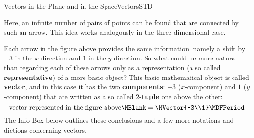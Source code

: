 \begin{MXContent}{Vectors in the Plane and in the Space}{Vectors}{STD}
\begin{center}
{
} 
\end{center}
Here, an infinite number of pairs of points can be found that are connected by such an arrow. 
This idea works analogously in the three-dimensional case.

Each arrow in the figure above provides the same information, namely a shift by $-3$ in 
the $x$-direction and $1$ in the $y$-direction. So what could be more natural than regarding each 
of these arrows only as a representation (a so called \textbf{representative}) of a more basic object?
This basic mathematical object is called \textbf{vector}, and in this case it has the 
two \textbf{components}: $-3$ ($x$-component) and $1$ ($y$-component) that are written as a so called 
$2$-\textbf{tuple} one above the other:
\[
 \textrm{vector represented in the figure above}\MBlank = \MVector{-3\\1}\MDFPeriod
\]
The Info Box below outlines these conclusions and a few more notations and dictions concerning vectors.


\end{MXContent}
